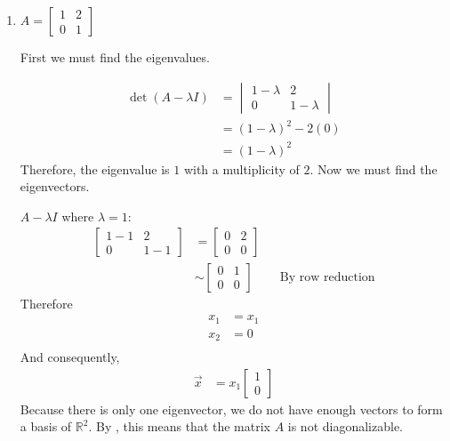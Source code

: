 \documentclass[10pt,letterpaper,final]{report}
\newcommand{\reason}[1]{&& \text{#1}}
\newcommand{\R}{\mathbb{R}}
\begin{document}
\begin{enumerate}[label=(\alph*)]
  \item $A = \begin{bmatrix}
            1 & 2 \\
            0 & 1
          \end{bmatrix}$

        First we must find the eigenvalues.

        \begin{align*}
          \det(A - \lambda I) & = \begin{vmatrix}
                                    1 - \lambda & 2           \\
                                    0           & 1 - \lambda
                                  \end{vmatrix} \\[1ex]
                              & = (1 - \lambda)^2 - 2(0)      \\[1ex]
                              & = (1 - \lambda)^2
        \end{align*}
        Therefore, the eigenvalue is $1$ with a multiplicity of $2$. Now we must find the eigenvectors.

        $A - \lambda I$ where $\lambda = 1$:
        \begin{align*}
          \begin{bmatrix}
            1 - 1 & 2     \\
            0     & 1 - 1
          \end{bmatrix} & = \begin{bmatrix}
                              0 & 2 \\
                              0 & 0
                            \end{bmatrix} \\ &\sim \begin{bmatrix}
                                                     0 & 1 \\
                                                     0 & 0
                                                   \end{bmatrix} \reason{By row reduction}
        \end{align*}
        Therefore
        \begin{align*}
          x_1 & = x_1 \\
          x_2 & = 0   \\
        \end{align*}
        And consequently,
        \begin{align*}
          \vec{x} & = x_1\begin{bmatrix}
                           1 \\
                           0
                         \end{bmatrix}
        \end{align*}
        Because there is only one eigenvector, we do not have enough vectors to form a basis of $\R^2$. By \textcite[Theorem~5.7, p.~294]{LayEtAl2020LinearAlgebraAndItsApplications}, this means that the matrix $A$ is not diagonalizable.


\end{enumerate}
\end{document}
